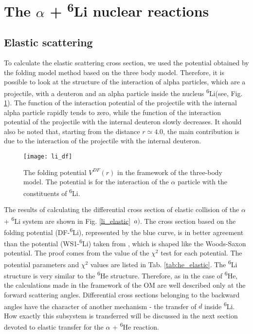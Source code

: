 \documentclass[
12pt, %
oneside, %
english, %
onehalfspacing, %
onehalfspacing, %
headsepline, %
]{MastersDoctoralThesis} %
\newcommand{\he}{\textsuperscript{6}He\xspace}
\newcommand{\li}{\textsuperscript{6}Li\xspace}
\begin{document}
\section{The $\alpha$ + \li nuclear reactions }
\subsection{Elastic scattering}

To calculate the elastic scattering cross section, we used the potential obtained by the folding model method based on the three body model. Therefore, it is possible to look at the structure of the interaction of alpha particles, which are a projectile, with a deuteron and an alpha particle inside the nucleus \li (see, Fig. \ref{li_df}). The function of the interaction potential of the projectile with the internal alpha particle rapidly tends to zero, while the function of the interaction potential of the projectile with the internal deuteron slowly decreases. It should also be noted that, starting from the distance $r \simeq 4.0$, the main contribution is due to the interaction of the projectile with the internal deuteron.

\begin{figure}[bp!]
\centering
\texttt{[image: li\_df]}
\decoRule
\caption{  \footnotesize  The folding potential $V^{DF}(r)$ in the framework of the three-body model. The potential is for the interaction of the $\alpha$ particle with the constituents of \li.
}
\label{li_df}
\end{figure}

The results of calculating the differential cross section of elastic collision of the $ \alpha $ + \li system are shown in Fig. \ref{li_elastic}~$a)$.
 The cross section based on the folding potential (DF-\li), represented by the blue curve, is in better agreement than the potential (WS1-\li) taken from \cite{oganessian1999dynamics}, which is shaped like the Woods-Saxon potential. 
 The proof comes from the value of the $\chi^2$ test for each potential. 
 The potential parameters and $\chi^2$ values are listed in Tab. \ref{tab:he_elastic}.
 The \li structure is very similar to the \he structure. Therefore, as in the case of \he, the calculations made in the framework of the OM are well described only at the forward scattering angles. 
 Differential cross sections belonging to the backward angles have the character of another mechanism - the transfer of $d$ inside \li. 
 How exactly this subsystem is transferred will be discussed in the next section devoted to elastic transfer for the $ \alpha$ + \he reaction.
\end{document}
